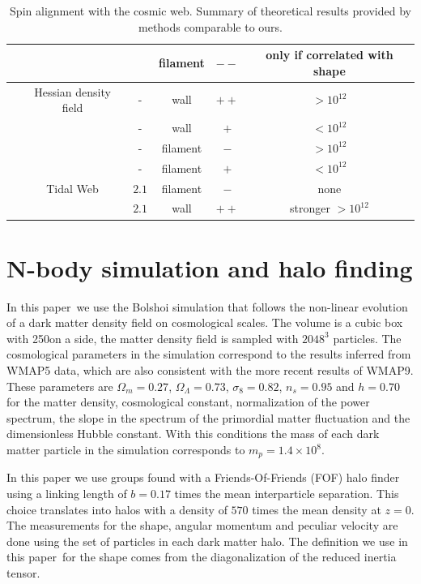 \documentclass[usenatbib]{mn2e}
\newcommand{\documentname}{paper~}
\newcommand{\hMpc}{{\ifmmode{h^{-1}{\rm Mpc}}\else{$h^{-1}$Mpc }\fi}}
\newcommand{\hMsun}{{\ifmmode{h^{-1}{\rm
        {M_{\odot}}}}\else{$h^{-1}{\rm{M_{\odot}}}$}\fi}}
\begin{document}
\begin{table}
\begin{tabular}{cccccc}
& &  & 
filament & $--$ & only if correlated with shape\\\hline

\cite{AragonCalvo2007} & Hessian density field & - &
wall & $++$ & $>10^{12}$\hMsun\\


& & - &
wall & $+$ & $<10^{12}$\hMsun\\

& & - &
filament& $-$ & $>10^{12}$\hMsun\\\hline


& & - &
filament& $+$ & $<10^{12}$\hMsun\\\hline



\cite{Hahn2007} & Tidal Web & $2.1$\hMpc & filament & $-$& none\\


& &  $2.1$\hMpc &
wall & $++$ & stronger $>10^{12}$\hMsun\\\hline \hline

\end{tabular}
\caption{Spin alignment with the cosmic web. Summary of theoretical
  results provided by methods comparable to ours.}

\end{table}



\section{N-body simulation and halo finding}


In this \documentname we use the Bolshoi simulation that follows the
non-linear evolution of a dark matter density field on cosmological
scales. The volume is a cubic box with 250\hMpc on a side, the matter
density field is sampled with $2048^3$ particles. The  
cosmological parameters in the simulation correspond to the results
inferred from WMAP5 data, which are also consistent with the more
recent results of WMAP9. These parameters are $\Omega_m=0.27$,
$\Omega_{\Lambda} =0.73$, $\sigma_8=0.82$, $n_s=0.95$ and $h=0.70$ for the
matter density, cosmological constant, normalization of the power
spectrum, the slope in the spectrum of the primordial matter
fluctuation and the dimensionless Hubble constant. With this
conditions the mass of each dark matter particle in the simulation
corresponds to $m_p=1.4\times 10^{8}$\hMsun. 


In this paper we use groups found with a Friends-Of-Friends (FOF) halo
finder using a linking length of $b=0.17$ times the mean interparticle
separation. This choice translates into halos with a density of $570$
times the mean density at $z=0$. The measurements for the shape,
angular momentum and peculiar velocity are done using the set of
particles in each dark matter halo. The definition we use in this
\documentname for the shape comes from the diagonalization of the
reduced inertia tensor.
\end{document}
